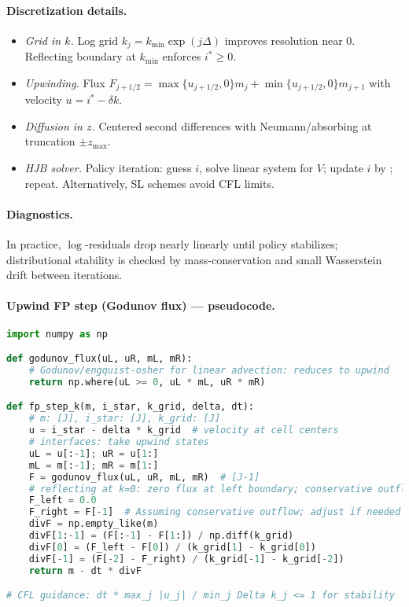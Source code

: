 ﻿\documentclass[11pt,letterpaper,oneside]{article}
\numberwithin{equation}{section}
\newcommand{\ac}[1]{{\mdseries\textsc{#1}}}
\newcommand{\1}{\mathbf{1}}
\begin{document}
\paragraph{Discretization details.}
\begin{itemize}[leftmargin=1.25em]
\item \emph{Grid in $k$.} Log grid $k_j=k_{\min}\exp(j\Delta)$ improves resolution near $0$. Reflecting boundary at $k_{\min}$ enforces $i^*\!\ge 0$.
\item \emph{Upwinding.} Flux $F_{j+1/2}=\max\{u_{j+1/2},0\}m_j+\min\{u_{j+1/2},0\}m_{j+1}$ with velocity $u=i^*-\delta k$.
\item \emph{Diffusion in $z$.} Centered second differences with Neumann/absorbing at truncation $\pm z_{\max}$.
\item \emph{HJB solver.} Policy iteration: guess $i$, solve linear system for $V$; update $i$ by ; repeat. Alternatively, \ac{SL} schemes avoid CFL limits.
\end{itemize}

\paragraph{Diagnostics.} In practice, $\log$-residuals drop nearly linearly until policy stabilizes; distributional stability is checked by mass-conservation and small Wasserstein drift between iterations.

\paragraph{Upwind FP step (Godunov flux) --- pseudocode.}
\begin{lstlisting}[language=Python,caption={1D upwind FV update for k-transport (reflecting at k=0)}]
import numpy as np

def godunov_flux(uL, uR, mL, mR):
    # Godunov/engquist-osher for linear advection: reduces to upwind
    return np.where(uL >= 0, uL * mL, uR * mR)

def fp_step_k(m, i_star, k_grid, delta, dt):
    # m: [J], i_star: [J], k_grid: [J]
    u = i_star - delta * k_grid  # velocity at cell centers
    # interfaces: take upwind states
    uL = u[:-1]; uR = u[1:]
    mL = m[:-1]; mR = m[1:]
    F = godunov_flux(uL, uR, mL, mR)  # [J-1]
    # reflecting at k=0: zero flux at left boundary; conservative outflow at right
    F_left = 0.0
    F_right = F[-1]  # Assuming conservative outflow; adjust if needed
    divF = np.empty_like(m)
    divF[1:-1] = (F[:-1] - F[1:]) / np.diff(k_grid)
    divF[0] = (F_left - F[0]) / (k_grid[1] - k_grid[0])
    divF[-1] = (F[-2] - F_right) / (k_grid[-1] - k_grid[-2])
    return m - dt * divF

# CFL guidance: dt * max_j |u_j| / min_j Delta k_j <= 1 for stability
\end{lstlisting}
\end{document}
